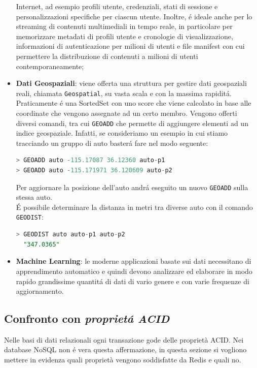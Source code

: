 \begin{itemize}
    Internet, ad esempio profili utente, credenziali, stati di sessione e personalizzazioni specifiche per ciascun utente. Inoltre, é ideale anche
    per lo streaming di contenuti multimediali in tempo reale, in particolare per memorizzare metadati di profili utente e cronologie di visualizzazione,
    informazioni di autenticazione per milioni di utenti e file manifest con cui permettere la distribuzione di contenuti a milioni di utenti
    contemporaneamente;
    \item \textbf{Dati Geospaziali}: viene offerta una struttura per gestire dati geospaziali reali, chiamata \texttt{Geospatial},
    su vasta scala e con la massima rapiditá. Praticamente é una SortedSet con uno score che viene calcolato in base alle coordinate che vengono assegnate ad un certo membro.
    Vengono offerti diversi comandi, tra cui \texttt{GEOADD} che permette di aggiungere elementi ad un indice geospaziale.
    Infatti, se consideriamo un esempio in cui stiamo tracciando un gruppo di auto basterá fare nel modo seguente:
    \begin{lstlisting}[autogobble, style=redis-cli, language=SQL]
> GEOADD auto -115.17087 36.12360 auto-p1
> GEOADD auto -115.171971 36.120609 auto-p2\end{lstlisting}
    Per aggiornare la posizione dell'auto andrá eseguito un nuovo \texttt{GEOADD} sulla stessa auto.\\
    É possibile determinare la distanza in metri tra diverse auto con il comando \texttt{GEODIST}:
    \begin{lstlisting}[autogobble, style=redis-cli, language=SQL]
> GEODIST auto auto-p1 auto-p2
  "347.0365"\end{lstlisting}
    \item \textbf{Machine Learning}: le moderne applicazioni basate sui dati necessitano di apprendimento automatico e quindi devono analizzare
    ed elaborare in modo rapido grandissime quantitá di dati di vario genere e con varie frequenze di aggiornamento.
\end{itemize}


\subsection{Confronto con \emph{proprietá ACID}}
Nelle basi di dati relazionali ogni transazione gode delle proprietà ACID. Nei database NoSQL non é vera questa affermazione, in questa
sezione si vogliono mettere in evidenza quali proprietà vengono soddisfatte da Redis e quali no.

